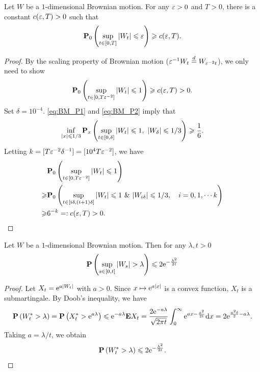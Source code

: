 \begin{proposition}\label{prop:BM_P2}
    Let $W$ be a $1$-dimensional Brownian motion. For any $\varepsilon>0$ and $T>0$, there is a constant $c(\varepsilon, T)>0$ such that 
    \[
        {\mathbf P}_0 \left(\sup_{t\in [0,T]}|W_t| \leqslant \varepsilon\right) \geqslant c(\varepsilon, T). 
    \]
\end{proposition}
\begin{proof}
    By the scaling property of Brownian motion ($\varepsilon^{-1}W_t\overset{d}{=} W_{\varepsilon^{-2}t}$), we only need to show 
    \[
        {\mathbf P}_0 \left(\sup_{t\in[0,T\varepsilon^{-2}]} |W_t|\leqslant 1 \right)\geqslant c(\varepsilon,T)>0. 
    \]
    Set \(\delta=10^{-4}\). \eqref{eq:BM_P1} and \eqref{eq:BM_P2} imply that 
    \[
        \inf_{|x|\leqslant 1/3} {\mathbf P}_x\left( \sup_{t\in [0,\delta]} |W_t|\leqslant 1, ~ |W_{\delta}| \leqslant 1/3\right)\geqslant \frac{1}{6}. 
    \]
    Letting $k=[T\varepsilon^{-2}\delta^{-1}]=[10^4T\varepsilon^{-2}]$, we have 
    \begin{align*}
        & {\mathbf P}_0\left( \sup_{t\in [0, T\varepsilon^{-2}]} |W_t|\leqslant 1 \right)\\
        \geqslant&  {\mathbf P}_0\left( \sup_{t\in [i\delta,(i+1)\delta]} |W_t|\leqslant 1 ~ \& ~ |W_{i\delta}|\leqslant 1/3, \quad i=0,1,\cdots k \right) \\
        \geqslant& 6^{-k}=: c(\varepsilon, T)>0. 
    \end{align*}
\end{proof}

\begin{proposition}\label{prop:BM_P1}
    Let $W$ be a $1$-dimensional Brownian motion. Then for any $\lambda, t>0$ 
    \begin{equation*}
        \bP \l(\sup_{s\in [0,t]}|W_s|> \lambda\r) \leq 2\e^{-\frac{\lambda^2}{2t}}
    \end{equation*}
\end{proposition}
\begin{proof}
    Let $X_t= \mathrm{e}^{a|W_t|}$ with $a>0$. Since $x\mapsto \mathrm{e}^{a|x|}$ is a convex function, $X_t$ is a submartingale. By Doob's inequality, we have 
    \begin{align*}
        {\mathbf P} \left(W^*_t>\lambda \right)= {\mathbf P} \left(X^*_t>\mathrm{e}^{a\lambda}\right)\leqslant \mathrm{e}^{-a\lambda} {\mathbf E} X_t = \frac{2\mathrm{e}^{-a \lambda} }{\sqrt{2\pi t}} \int_{0}^\infty \mathrm{e}^{a x-\frac{x^2}{2t}} \text{\rm{d}} x = 2\mathrm{e}^{\frac{a^2 t}{2}-a\lambda}.
    \end{align*}
    Taking $a=\lambda/t$, we obtain 
    \[
    {\mathbf P} \left(W^*_t>\lambda \right) \leqslant 2 \mathrm{e}^{-\frac{\lambda^2}{2t}}. 
    \]
\end{proof}

